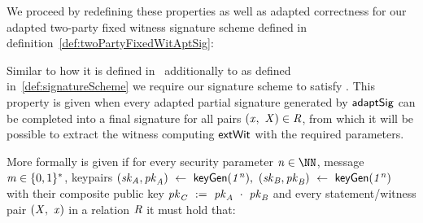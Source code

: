 We proceed by redefining these properties as well as adapted correctness for our adapted two-party fixed witness signature scheme defined in definition~\ref{def:twoPartyFixedWitAptSig}:

\begin{definition}[\cnstAptSigCorrectness]
    \label{def:aptSigCorrectness}
    Similar to how it is defined in~\cite{aumayr2020bitcoinchannels} additionally to \cnstCorrectness as defined in~\ref{def:signatureScheme} we require our signature scheme to satisfy \cnstAptSigCorrectness.
    This property is given when every adapted partial signature generated by $\mathsf{adaptSig}$ can be completed into a final signature for all pairs $(\mathit{x} ,~ \mathit{X}) \in \mathit{R}$, from which it will
    be possible to extract the witness computing $\mathsf{extWit}$ with the required parameters.

    More formally \cnstAptSigCorrectness is given if for every security parameter $\varN \in \cnstNatural$, message $\mathit{m} \in \{0,1\}^{*}$, keypairs $(\mathit{sk}_{\mathit{A}}, \mathit{pk}_{\mathit{A}}) ~\leftarrow~ \mathsf{keyGen}(\mathit{1^n}) ,~
    (\mathit{sk}_{\mathit{B}}, \mathit{pk}_{\mathit{B}}) ~\leftarrow~ \mathsf{keyGen}(\mathit{1^n})$
    with their composite public key $\mathit{pk}_{\mathit{C}} ~:=~ \mathit{pk}_{\mathit{A}} ~\cdot~ \mathit{pk}_{\mathit{B}}$ 
    and every statement/witness pair $(\mathit{X} ,~ \mathit{x})$ in a relation $\mathit{R}$ it must hold that:


\end{definition}

